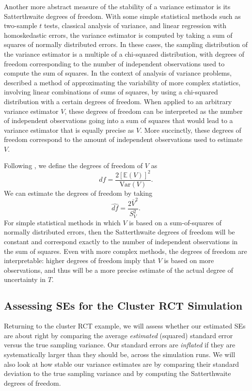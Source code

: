 \documentclass[
]{book}
\newcommand{\E}{\mathbb{E}}
\newcommand{\Var}{\text{Var}}
\begin{document}
Another more abstract measure of the stability of a variance estimator is its Satterthwaite degrees of freedom.
With some simple statistical methods such as two-sample \(t\) tests, classical analysis of variance, and linear regression with homoskedastic errors, the variance estimator is computed by taking a sum of squares of normally distributed errors.
In these cases, the sampling distribution of the variance estimator is a multiple of a chi-squared distribution, with degrees of freedom corresponding to the number of independent observations used to compute the sum of squares.
In the context of analysis of variance problems, \citet{Satterthwaite1946approximate} described a method of approximating the variability of more complex statistics, involving linear combinations of sums of squares, by using a chi-squared distribution with a certain degrees of freedom.
When applied to an arbitrary variance estimator \(V\), these degrees of freedom can be interpreted as the number of independent observations going into a sum of squares that would lead to a variance estimator that is equally precise as \(V\).
More succinctly, these degrees of freedom correspond to the amount of independent observations used to estimate \(V\).

Following \citet{Satterthwaite1946approximate}, we define the degrees of freedom of \(V\) as
\[
df = \frac{2 \left[\E(V)\right]^2}{\Var(V)}.
\label{eq:Satterthwaite-df}
\]
We can estimate the degrees of freedom by taking
\[
\widehat{df} = \frac{2 \bar{V}^2}{S_V^2}.
\label{eq:Satterthwaite-df-estimator}
\]
For simple statistical methods in which \(V\) is based on a sum-of-squares of normally distributed errors, then the Satterthwaite degrees of freedom will be constant and correspond exactly to the number of independent observations in the sum of squares.
Even with more complex methods, the degrees of freedom are interpretable: higher degrees of freedom imply that \(V\) is based on more observations, and thus will be a more precise estimate of the actual degree of uncertainty in \(T\).

\subsection{Assessing SEs for the Cluster RCT Simulation}\label{assessing-ses-for-the-cluster-rct-simulation}

Returning to the cluster RCT example, we will assess whether our estimated SEs are about right by comparing the average \emph{estimated} (squared) standard error versus the true sampling variance.
Our standard errors are \emph{inflated} if they are systematically larger than they should be, across the simulation runs.
We will also look at how stable our variance estimates are by comparing their standard deviation to the true sampling variance and by computing the Satterthwaite degrees of freedom.
\end{document}
